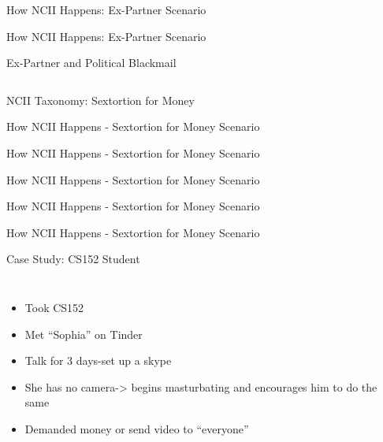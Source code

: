 \documentclass[nobackground,dvipsnames,table,aspectratio=169]{beamer}
\begin{document}
\begin{frame}{How NCII Happens: Ex-Partner Scenario}
\end{frame}

\begin{frame}{How NCII Happens: Ex-Partner Scenario}
\end{frame}

\begin{frame}{Ex-Partner and Political Blackmail}
    \begin{columns}
    \end{columns}
\end{frame}

\begin{frame}{NCII Taxonomy: Sextortion for Money}
\end{frame}

\begin{frame}{How NCII Happens - Sextortion for Money Scenario}
\end{frame}

\begin{frame}{How NCII Happens - Sextortion for Money Scenario}
\end{frame}

\begin{frame}{How NCII Happens - Sextortion for Money Scenario}
\end{frame}

\begin{frame}{How NCII Happens - Sextortion for Money Scenario}
\end{frame}

\begin{frame}{How NCII Happens - Sextortion for Money Scenario}
\end{frame}

\begin{frame}{Case Study: CS152 Student}
    \begin{columns}
            \begin{itemize}
                \item Took CS152 
                \item Met “Sophia” on Tinder
                \item Talk for 3 days-set up a skype
                \item She has no camera-> begins masturbating and encourages him to do the same
                \item Demanded money or send video to “everyone”
            \end{itemize}
    \end{columns}
\end{frame}
\end{document}
